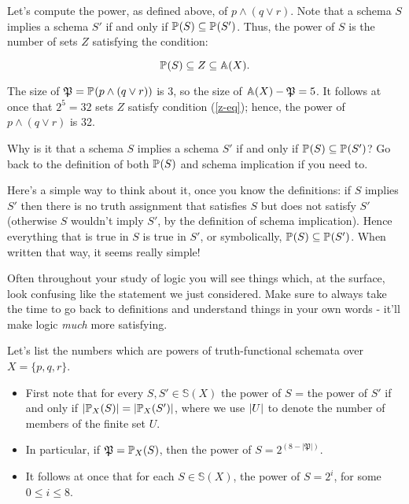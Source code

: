 \begin{example}
    Let's compute the power, as defined above, of $p\wedge (q\vee r)$. Note that a schema $S$ implies a schema $S'$ if and only if $\prop{S}{}\subseteq\prop{S'}{}$. Thus, the power of $S$ is the number of sets $Z$ satisfying the condition: 

    \begin{equation}\label{z-eq}
        \prop{S}{}\subseteq Z\subseteq \mathbb{A}(X). 
    \end{equation}

    The size of $\mfp=\prop{p\wedge (q\vee r)}{}$ is 3, so the size of $\mathbb{A}(X)-\mfp=5$. It follows at once that $2^5 =32$ sets $Z$ satisfy condition (\ref{z-eq}); hence, the power of $p\wedge (q\vee r)$ is 32.
\end{example}

\begin{aside}
    Why is it that a schema $S$ implies a schema $S'$ if and only if $\prop{S}{}\subseteq\prop{S'}{}$? Go back to the definition of both $\prop{S}{}$ and schema implication if you need to. 

    Here's a simple way to think about it, once you know the definitions: if $S$ implies $S'$ then there is no truth assignment that satisfies $S$ but does not satisfy $S'$ (otherwise $S$ wouldn't imply $S'$, by the definition of schema implication). Hence everything that is true in $S$ is true in $S'$, or symbolically, $\prop{S}{}\subseteq\prop{S'}{}$. When written that way, it seems really simple!

    Often throughout your study of logic you will see things which, at the surface, look confusing like the statement we just considered. Make sure to always take the time to go back to definitions and understand things in your own words - it'll make logic \emph{much} more satisfying. 
\end{aside}

\begin{example}
    Let's list the numbers which are powers of truth-functional schemata over $X=\{p,q,r\}$.

    \begin{itemize}
        \item First note that for every $S,S'\in\mathbb{S}(X)$ the power of $S$ = the power of $S'$ if and only if $\size{\prop{S}{X}}=\size{\prop{S'}{X}}$, where we use $\size{U}$ to denote the number of members of the finite set $U$. 

        \item In particular, if $\mfp=\prop{S}{X}$, then the power of $S = 2^{(8-|\mathfrak{P}|)}$.

        \item It follows at once that for each $S\in\mathbb{S}(X)$, the power of $S = 2^i$, for some $0\leq i\leq 8$.
    \end{itemize}  
\end{example}

